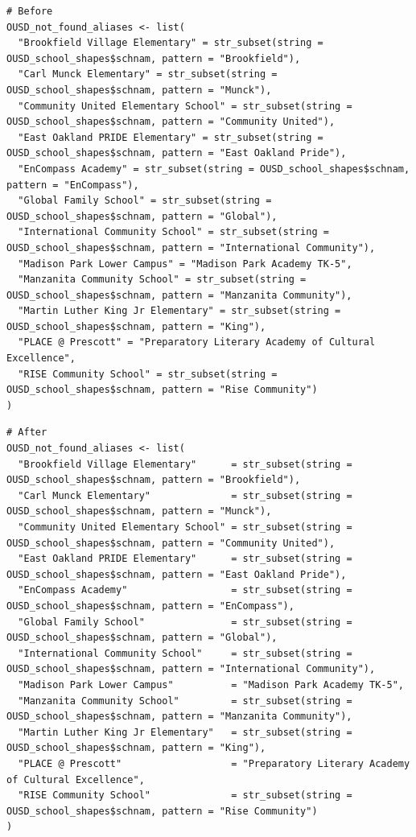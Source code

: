 \documentclass[]{book}
\begin{document}
\begin{verbatim}
# Before
OUSD_not_found_aliases <- list(
  "Brookfield Village Elementary" = str_subset(string = OUSD_school_shapes$schnam, pattern = "Brookfield"),
  "Carl Munck Elementary" = str_subset(string = OUSD_school_shapes$schnam, pattern = "Munck"),
  "Community United Elementary School" = str_subset(string = OUSD_school_shapes$schnam, pattern = "Community United"),
  "East Oakland PRIDE Elementary" = str_subset(string = OUSD_school_shapes$schnam, pattern = "East Oakland Pride"),
  "EnCompass Academy" = str_subset(string = OUSD_school_shapes$schnam, pattern = "EnCompass"),
  "Global Family School" = str_subset(string = OUSD_school_shapes$schnam, pattern = "Global"),
  "International Community School" = str_subset(string = OUSD_school_shapes$schnam, pattern = "International Community"),
  "Madison Park Lower Campus" = "Madison Park Academy TK-5",
  "Manzanita Community School" = str_subset(string = OUSD_school_shapes$schnam, pattern = "Manzanita Community"),
  "Martin Luther King Jr Elementary" = str_subset(string = OUSD_school_shapes$schnam, pattern = "King"),
  "PLACE @ Prescott" = "Preparatory Literary Academy of Cultural Excellence",
  "RISE Community School" = str_subset(string = OUSD_school_shapes$schnam, pattern = "Rise Community")
)
\end{verbatim}

\begin{verbatim}
# After
OUSD_not_found_aliases <- list(
  "Brookfield Village Elementary"      = str_subset(string = OUSD_school_shapes$schnam, pattern = "Brookfield"),
  "Carl Munck Elementary"              = str_subset(string = OUSD_school_shapes$schnam, pattern = "Munck"),
  "Community United Elementary School" = str_subset(string = OUSD_school_shapes$schnam, pattern = "Community United"),
  "East Oakland PRIDE Elementary"      = str_subset(string = OUSD_school_shapes$schnam, pattern = "East Oakland Pride"),
  "EnCompass Academy"                  = str_subset(string = OUSD_school_shapes$schnam, pattern = "EnCompass"),
  "Global Family School"               = str_subset(string = OUSD_school_shapes$schnam, pattern = "Global"),
  "International Community School"     = str_subset(string = OUSD_school_shapes$schnam, pattern = "International Community"),
  "Madison Park Lower Campus"          = "Madison Park Academy TK-5",
  "Manzanita Community School"         = str_subset(string = OUSD_school_shapes$schnam, pattern = "Manzanita Community"),
  "Martin Luther King Jr Elementary"   = str_subset(string = OUSD_school_shapes$schnam, pattern = "King"),
  "PLACE @ Prescott"                   = "Preparatory Literary Academy of Cultural Excellence",
  "RISE Community School"              = str_subset(string = OUSD_school_shapes$schnam, pattern = "Rise Community")
)
\end{verbatim}
\end{document}
